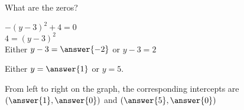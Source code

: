 \documentclass{ximera}
\begin{document}
\begin{exercise} What are the zeros?



$-(y-3)^2 + 4 = 0$ \\

$4 = (y-3)^2 $ \\


Either $y-3 = \answer{-2}$ or $y-3 = 2$


Either $y = \answer{1}$ or $y = 5$.


From left to right on the graph, the corresponding intercepts are $\left( \answer{1}, \answer{0} \right)$ and $\left( \answer{5}, \answer{0} \right)$



\end{exercise}
\end{document}

